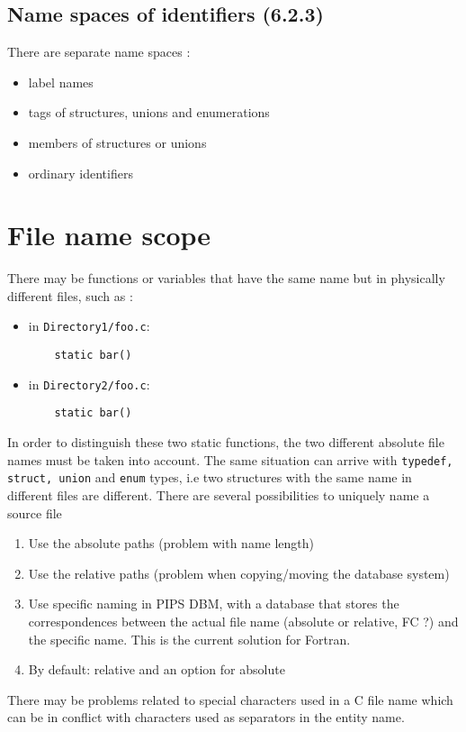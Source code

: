 \documentclass[a4paper]{report}
\begin{document}
\subsection{Name spaces of identifiers (6.2.3)}

There are separate name spaces : 
\begin{itemize}
\item label names
\item tags of structures, unions and enumerations 
\item members of structures or unions
\item ordinary identifiers 
\end{itemize}

\section{File name scope}

There may be functions or variables that have the same name but in physically
  different files, such as :

\begin{itemize}
\item in \texttt{Directory1/foo.c}:
  \begin{lstlisting}
    static bar()
  \end{lstlisting}
\item in \texttt{Directory2/foo.c}:
  \begin{lstlisting}
    static bar()
  \end{lstlisting}
\end{itemize}

In order to distinguish these two static functions, the two different absolute file names must be taken into account. The same situation can arrive with \verb/typedef, struct, union/
 and  \verb/enum/ types, i.e two structures with the same name in
 different files are different. 
There are several possibilities to uniquely name a source file
\begin{enumerate}
\item Use the absolute paths (problem with name length)
\item Use the relative paths (problem when copying/moving the
  database system)
\item Use specific naming in PIPS DBM, with a database that stores the
  correspondences between the actual file name (absolute or relative, FC
  ?) and the specific name. This is the current solution for Fortran.
\item By default: relative and an option for absolute 
\end{enumerate}
There may be problems related to special characters used
in a C file name which can be in conflict with characters used as
separators in the entity name. 
\end{document}
